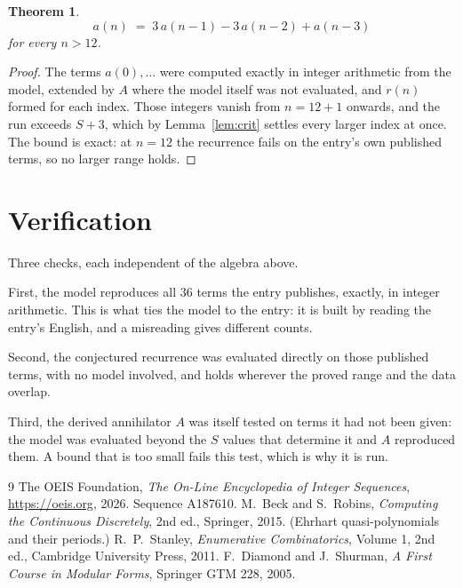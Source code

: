 \documentclass[11pt,a4paper]{article}
\theoremstyle{plain}
\newtheorem{theorem}{Theorem}
\theoremstyle{definition}
\begin{document}
\begin{theorem}
\[
a(n)\;=\;3\,a(n-1) - 3\,a(n-2) + a(n-3)
\]
for every $n>12$.
\end{theorem}

\begin{proof}
The terms $a(0),\dots$ were computed exactly in integer arithmetic from the model, extended by
$A$ where the model itself was not evaluated, and $r(n)$ formed for each index. Those integers
vanish from $n=12+1$ onwards, and the run exceeds $S+3$, which by
Lemma~\ref{lem:crit} settles every larger index at once. The bound is exact: at $n=12$ the recurrence fails on the entry's own published terms, so no larger range holds.
\end{proof}

\section{Verification}

Three checks, each independent of the algebra above.

First, the model reproduces all $36$ terms the entry publishes, exactly, in integer
arithmetic. This is what ties the model to the entry: it is built by reading the entry's
English, and a misreading gives different counts.

Second, the conjectured recurrence was evaluated directly on those published terms, with no
model involved, and holds wherever the proved range and the data overlap.

Third, the derived annihilator $A$ was itself tested on terms it had not been given: the model
was evaluated beyond the $S$ values that determine it and $A$ reproduced them. A bound that is
too small fails this test, which is why it is run.

\begin{thebibliography}{9}
 The OEIS Foundation, \emph{The On-Line Encyclopedia of Integer
Sequences}, \url{https://oeis.org}, 2026. Sequence A187610.
 M.~Beck and S.~Robins, \emph{Computing the Continuous Discretely},
2nd ed., Springer, 2015. (Ehrhart quasi-polynomials and their periods.)
 R.~P.~Stanley, \emph{Enumerative Combinatorics}, Volume 1, 2nd ed.,
Cambridge University Press, 2011.
 F.~Diamond and J.~Shurman, \emph{A First Course in Modular Forms},
Springer GTM 228, 2005.
\end{thebibliography}
\end{document}
